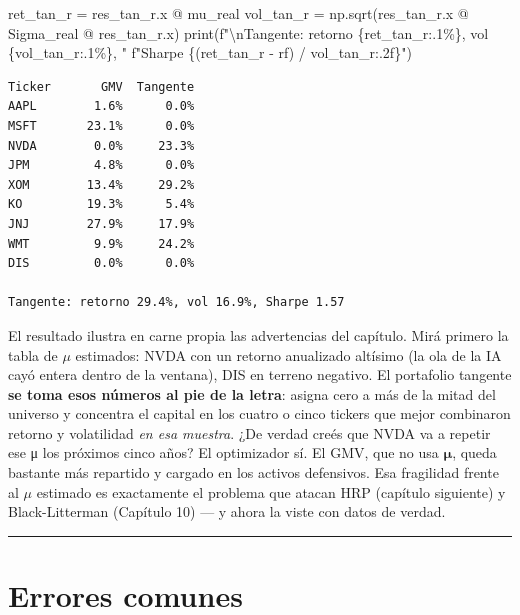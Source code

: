 \documentclass[
  spanish,
  letterpaper,
  DIV=11,
  numbers=noendperiod]{scrreprt}
\newenvironment{Shaded}{\begin{snugshade}}{\end{snugshade}}
\newcommand{\BuiltInTok}[1]{\textcolor[rgb]{0.00,0.23,0.31}{#1}}
\newcommand{\CharTok}[1]{\textcolor[rgb]{0.13,0.47,0.30}{#1}}
\newcommand{\NormalTok}[1]{\textcolor[rgb]{0.00,0.23,0.31}{#1}}
\newcommand{\OperatorTok}[1]{\textcolor[rgb]{0.37,0.37,0.37}{#1}}
\newcommand{\SpecialCharTok}[1]{\textcolor[rgb]{0.37,0.37,0.37}{#1}}
\newcommand{\SpecialStringTok}[1]{\textcolor[rgb]{0.13,0.47,0.30}{#1}}
\begin{document}
\begin{Shaded}
\begin{Highlighting}[]
\NormalTok{ret\_tan\_r }\OperatorTok{=}\NormalTok{ res\_tan\_r.x }\OperatorTok{@}\NormalTok{ mu\_real}
\NormalTok{vol\_tan\_r }\OperatorTok{=}\NormalTok{ np.sqrt(res\_tan\_r.x }\OperatorTok{@}\NormalTok{ Sigma\_real }\OperatorTok{@}\NormalTok{ res\_tan\_r.x)}
\BuiltInTok{print}\NormalTok{(}\SpecialStringTok{f"}\CharTok{\textbackslash{}n}\SpecialStringTok{Tangente: retorno }\SpecialCharTok{\{}\NormalTok{ret\_tan\_r}\SpecialCharTok{:.1\%\}}\SpecialStringTok{, vol }\SpecialCharTok{\{}\NormalTok{vol\_tan\_r}\SpecialCharTok{:.1\%\}}\SpecialStringTok{, "}
      \SpecialStringTok{f"Sharpe }\SpecialCharTok{\{}\NormalTok{(ret\_tan\_r }\OperatorTok{{-}}\NormalTok{ rf) }\OperatorTok{/}\NormalTok{ vol\_tan\_r}\SpecialCharTok{:.2f\}}\SpecialStringTok{"}\NormalTok{)}
\end{Highlighting}
\end{Shaded}

\begin{verbatim}
Ticker       GMV  Tangente
AAPL        1.6%      0.0%
MSFT       23.1%      0.0%
NVDA        0.0%     23.3%
JPM         4.8%      0.0%
XOM        13.4%     29.2%
KO         19.3%      5.4%
JNJ        27.9%     17.9%
WMT         9.9%     24.2%
DIS         0.0%      0.0%

Tangente: retorno 29.4%, vol 16.9%, Sharpe 1.57
\end{verbatim}

El resultado ilustra en carne propia las advertencias del capítulo. Mirá
primero la tabla de \(\mu\) estimados: NVDA con un retorno anualizado
altísimo (la ola de la IA cayó entera dentro de la ventana), DIS en
terreno negativo. El portafolio tangente \textbf{se toma esos números al
pie de la letra}: asigna cero a más de la mitad del universo y concentra
el capital en los cuatro o cinco tickers que mejor combinaron retorno y
volatilidad \emph{en esa muestra}. ¿De verdad creés que NVDA va a
repetir ese μ los próximos cinco años? El optimizador sí. El GMV, que no
usa \(\boldsymbol{\mu}\), queda bastante más repartido y cargado en los
activos defensivos. Esa fragilidad frente al \(\mu\) estimado es
exactamente el problema que atacan HRP (capítulo siguiente) y
Black-Litterman (Capítulo 10) --- y ahora la viste con datos de verdad.

\begin{center}\rule{0.5\linewidth}{0.5pt}\end{center}

\chapter{Errores comunes}\label{errores-comunes-6}
\end{document}
